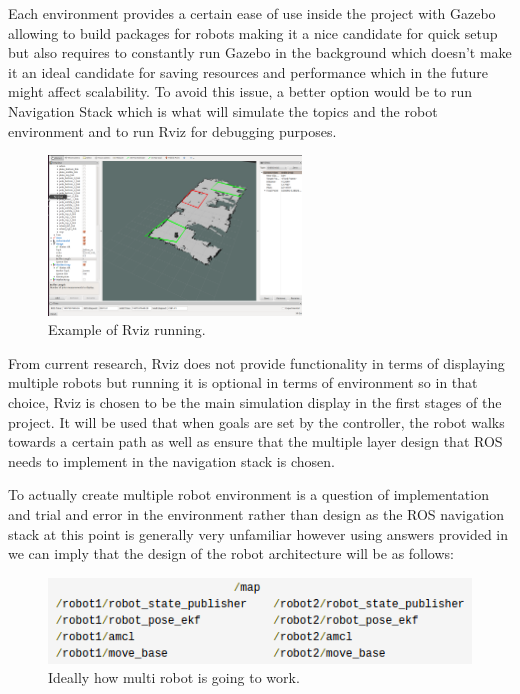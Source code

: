 \documentclass{report}
\begin{document}
      Each environment provides a certain ease of use inside the project with Gazebo allowing to build packages for robots making it a nice candidate for quick setup but also requires to constantly run Gazebo in the background which doesn't make it an ideal candidate for saving resources and performance which in the future might affect scalability. To avoid this issue, a better option would be to run Navigation Stack which is what will simulate the topics and the robot environment and to run Rviz for debugging purposes.

        \begin{figure}[!ht]  
          \centering
            \includegraphics[width=0.6\textwidth]{figures/RVIZ.png}
            \caption{Example of Rviz running.}
        \end{figure}

      From current research, Rviz does not provide functionality in terms of displaying multiple robots but running it is optional in terms of environment so in that choice, Rviz is chosen to be the main simulation display in the first stages of the project. It will be used that when goals are set by the controller, the robot walks towards a certain path as well as ensure that the multiple layer design that ROS needs to implement in the navigation stack is chosen.

      To actually create multiple robot environment is a question of implementation and trial and error in the environment rather than design as the ROS navigation stack at this point is generally very unfamiliar however using answers provided in \cite{wiki1} we can imply that the design of the robot architecture will be as follows:

        \begin{figure}[!ht]  
          \centering
            \includegraphics[width=1\textwidth]{figures/ROSPlan.png}
            \caption{Ideally how multi robot is going to work.}
        \end{figure}
\end{document}
